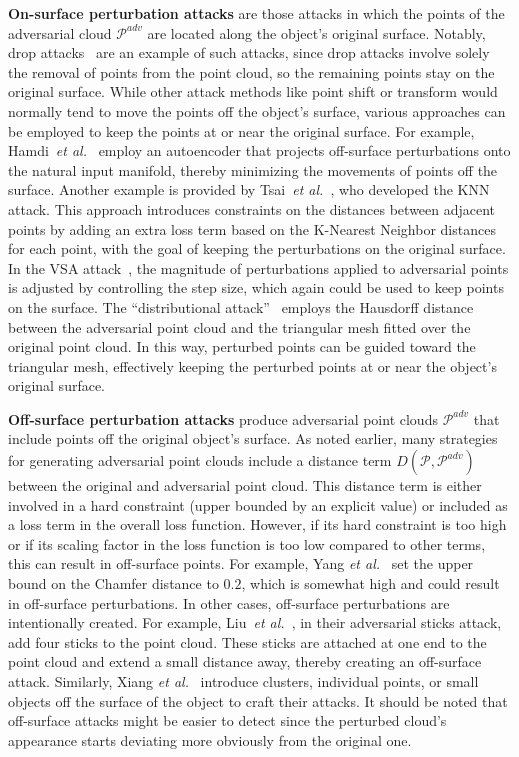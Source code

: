 \documentclass{ieeeaccess}
\def\etal{\textit{et al.}}
\begin{document}
\textbf{On-surface perturbation attacks} are those attacks in which the points of the adversarial cloud $\mathcal{P}^{adv}$ are located along the object's original surface. Notably, drop attacks~\cite{zheng2019pointcloud,wicker2019robustness,yang2019adversarial} are an example of such attacks, since drop attacks involve solely the removal of points from the point cloud, so the remaining points stay on the original surface. While other attack methods like point shift or transform would normally tend to move the points off the object's surface, various approaches can be employed to keep the points at or near the original surface. For example, Hamdi~\etal~\cite{hamdi2020advpc} employ an autoencoder that projects off-surface perturbations onto the natural input manifold, thereby minimizing the movements of points off the surface. Another example is provided by Tsai~\etal~\cite{tsai2020robust}, who developed the KNN attack. This approach introduces constraints on the distances between adjacent points by adding an extra loss term based on the K-Nearest Neighbor distances for each point, with the goal of keeping the perturbations on the original surface. 
In the VSA attack~\cite{arya2021adversarial}, the magnitude of perturbations applied to adversarial points is adjusted by controlling the step size, which again could be used to keep points on the surface. The ``distributional attack''~\cite{liu2020adversarial} employs the Hausdorff distance between the adversarial point cloud and the triangular mesh fitted over the original point cloud. In this way, perturbed points can be guided toward the triangular mesh, effectively keeping the perturbed points at or near the object's original surface.

\textbf{Off-surface perturbation attacks} produce adversarial point clouds $\mathcal{P}^{adv}$ that include points off the original object's surface. As noted earlier, many strategies for generating adversarial point clouds include a distance term $D(\mathcal{P},\mathcal{P}^{adv})$ between the original and adversarial point cloud. This distance term is either involved in a hard constraint (upper bounded by an explicit value) or included as a loss term in the overall loss function. However, if its hard constraint is too high or if its scaling factor in the loss function is too low compared to other terms, this can result in off-surface points. For example, Yang \etal~\cite{yang2019adversarial} set the upper bound on the Chamfer distance to $0.2$, which is somewhat high and could result in off-surface perturbations. In other cases, off-surface perturbations are intentionally created. For example, Liu~\etal~\cite{liu2020adversarial}, in their adversarial sticks attack, add four sticks to the point cloud. These sticks are attached at one end to the point cloud and extend a small distance away, thereby creating an off-surface attack. Similarly, Xiang \etal~\cite{xiang2019generating} introduce clusters, individual points, or small objects off the surface of the object to craft their attacks. It should be noted that off-surface attacks might be easier to detect since the perturbed cloud's appearance starts deviating more obviously from the original one.
\end{document}
